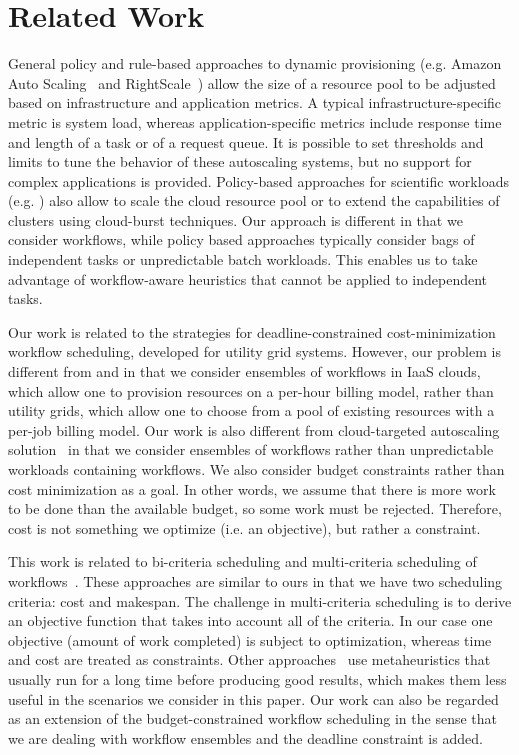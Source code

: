 \documentclass[conference]{IEEEtran}
\begin{document}
\section{Related Work}
\label{sec:related}
General policy and rule-based approaches to dynamic provisioning (e.g. Amazon
Auto Scaling~\cite{Autoscaling} and
RightScale~\cite{RightScale}) allow the size
of a resource pool to be adjusted based on infrastructure and
application metrics. A typical infrastruc\-ture-specific metric is system load,
whereas application-speci\-fic metrics include response time and length of a task or
of a request queue. It is possible to set thresholds and limits to tune the behavior
of these autoscaling systems, but no support for complex applications is provided.
Policy-based approaches for scientific workloads (e.g. \cite{Marshall2010,
Kim2011}) also allow to scale the cloud resource pool or to extend the
capabilities of clusters using cloud-burst techniques. Our approach is different
in that we consider workflows, while policy based approaches typically consider
bags of independent tasks or unpredictable batch workloads. This enables us to
take advantage of workflow-aware heuristics that cannot be applied to
independent tasks.


Our work is related to the strategies for deadline-con\-strained
cost-minimization workflow scheduling, developed for utility grid systems. However, our problem is
different from \cite{Yu2005} and \cite{Abrishami2010} in that we consider ensembles of workflows in
IaaS clouds, which allow one to provision resources on a per-hour billing model,
rather than utility grids, which allow one to choose from a pool of existing
resources with a per-job billing model. Our work is also different from
cloud-targeted autoscaling solution~\cite{Mao2011} in that we consider ensembles
of workflows rather than unpredictable workloads containing workflows. We also consider budget constraints
rather than cost minimization as a goal. In other words, we assume that there is
more work to be done than the available budget, so some work must be rejected.
Therefore, cost is not something we optimize (i.e. an objective), but rather a constraint.


This work is related to bi-criteria scheduling and multi-criteria scheduling of
workflows~\cite{Wieczorek2009,Prodan2010,Dongarra2007}. These approaches are
similar to ours in that we have two scheduling criteria: cost and makespan. The
challenge in multi-criteria scheduling is to derive an objective function that
takes into account all of the criteria. In our case one objective (amount
of work completed) is subject to optimization, whereas time and cost are
treated as constraints. Other approaches~\cite{Talukder2009,Pandey2010} use
metaheuristics that usually run for a long time before producing good results,
which makes them less useful in the scenarios we consider in this paper. Our work can also
be regarded as an extension of the budget-constrained workflow scheduling
\cite{Sakellariou2007} in the sense that we are dealing with workflow ensembles
and the deadline constraint is added.
\end{document}
